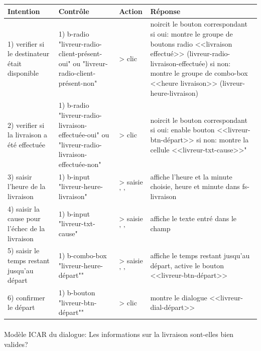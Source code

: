 \documentclass{report}
\begin{document}
\begin{longtable}{|p{3cm}|p{4cm}|p{2cm}|p{5cm}|}
\hline
Intention&Contrôle&Action&Réponse\\\hline
1) verifier si le destinateur était disponible&1) b-radio \newline
"livreur-radio-client-présent-oui" ou "livreur-radio-client-présent-non"&> clic&noircit le bouton correspondant\newline
si oui: montre le groupe de boutons radio <<livraison effectué>> (livreur-radio-livraison-effectuée)\newline
si non: montre le groupe de combo-box <<heure livraison>> (livreur-heure-livraison)\\\hline
2) verifier si la livraison a été effectuée&1) b-radio \newline
"livreur-radio-livraison-effectuée-oui" ou "livreur-radio-livraison-effectuée-non"&> clic&noircit le bouton correspondant\newline
si oui: enable bouton <<livreur-btn-départ>>\newline
si non: montre la cellule <<livreur-txt-cause>>"\\\hline
3) saisir l'heure de la livraison&1) b-input \newline
"livreur-heure-livraison"&> saisie ' '&affiche l'heure et la minute choisie, heure et minute dans fs-livraison\\\hline
4) saisir la cause pour l'échec de la livraison&1) b-input \newline
"livreur-txt-cause"&> saisie ' '&affiche le texte entré dans le champ\\\hline
5) saisir le temps restant jusqu'au départ&1) b-combo-box\newline
"livreur-heure-départ""&> saisie ' '&affiche le temps restant jusqu'au départ, active le bouton <<livreur-btn-départ>>\\\hline
6) confirmer le départ&1) b-bouton \newline
"livreur-btn-départ""&> clic&montre le dialogue <<livreur-dial-départ>>\\\hline
\end{longtable}


\paragraph{}
Modèle ICAR du dialogue: Les informations sur la livraison sont-elles bien valides?
\end{document}
